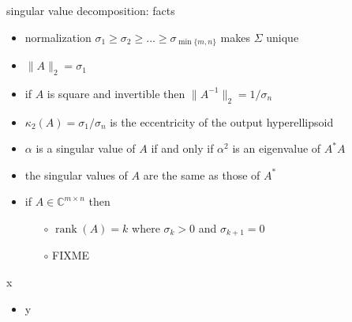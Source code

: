 \documentclass[10pt,hyperref]{beamer}
\newcommand{\CC}{\mathbb{C}}
\newcommand{\rank}{\operatorname{rank}}
\begin{document}
\begin{frame}{singular value decomposition: facts}

\begin{itemize}
\item normalization $\sigma_1\ge \sigma_2 \ge \dots \ge \sigma_{\min\{m,n\}}$ makes $\Sigma$ unique
\item $\|A\|_2=\sigma_1$
\item if $A$ is square and invertible then $\|A^{-1}\|_2 = 1/\sigma_n$
\item $\kappa_2(A) = \sigma_1/\sigma_n$ is the eccentricity of the output hyperellipsoid
\item $\alpha$ is a singular value of $A$ if and only if $\alpha^2$ is an eigenvalue of $A^*A$
\item the singular values of $A$ are the same as those of $A^*$
\item if $A\in \CC^{m\times n}$ then
    \begin{itemize}
    \item[$\circ$] $\rank(A)=k$ where $\sigma_k>0$ and $\sigma_{k+1}=0$
    \item[$\circ$] FIXME
    \end{itemize}
\end{itemize}
\end{frame}

\begin{frame}{x}

\begin{itemize}
\item y
\end{itemize}
\end{frame}
\end{document}
